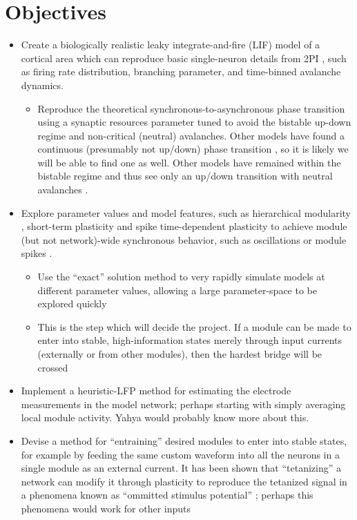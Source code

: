 \documentclass[a4paper, 12pt]{article}
\begin{document}
\section*{Objectives}
\begin{itemize}
\item Create a biologically realistic \cite{objectworkingmemory, biologicalsoc} leaky integrate-and-fire (LIF) model of a cortical area which can reproduce basic single-neuron details from 2PI \cite{bellaypaper}, such as firing rate distribution, branching parameter, and time-binned avalanche dynamics.
  \begin{itemize}
  \item Reproduce the theoretical synchronous-to-asynchronous phase transition \cite{munozlg} using a synaptic resources parameter tuned to avoid the bistable up-down regime and non-critical (neutral) avalanches. Other models have found a continuous (presumably not up/down) phase transition \cite{rubinov}, so it is likely we will be able to find one as well. Other models have remained within the bistable regime and thus see only an up/down transition with neutral avalanches \cite{neutraltheory}.
  \end{itemize}
\item Explore parameter values and model features, such as hierarchical modularity \cite{rubinov, mountcastle}, short-term plasticity \cite{dynamicsynapses} and spike time-dependent plasticity \cite{heterogeneousnetwork, biologicalsoc, rubinov} to achieve module (but not network)-wide synchronous behavior, such as oscillations \cite{munozlg} or module spikes \cite{rubinov}.
  \begin{itemize}
  \item Use the ``exact'' solution method to very rapidly simulate models at different parameter values, allowing a large parameter-space to be explored quickly \cite{exactsolution}
  \item This is the step which will decide the project. If a module can be made to enter into stable, high-information states merely through input currents (externally or from other modules), then the hardest bridge will be crossed
  \end{itemize}
\item Implement a heuristic-LFP method for estimating the electrode measurements in the model network; perhaps starting with simply averaging local module activity. Yahya would probably know more about this.
\item Devise a method for ``entraining'' desired modules to enter into stable states, for example by feeding the same custom waveform into all the neurons in a single module as an external current. It has been shown that ``tetanizing'' a network can modify it through plasticity to reproduce the tetanized signal in a phenomena known as ``ommitted stimulus potential'' \cite{heterogeneousnetwork}; perhaps this phenomena would work for other inputs
\end{itemize}
\end{document}
